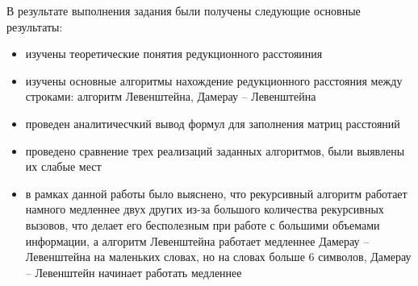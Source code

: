 \Conclusion %

В результате выполнения задания были получены следующие основные результаты:

\begin{itemize}
    \item изучены теоретические понятия редукционного расстояиния
    \item изучены основные алгоритмы нахождение редукционного расстояния между строками: алгоритм Левенштейна, Дамерау -- Левенштейна
    \item проведен аналитичесчкий вывод формул для заполнения матриц расстояний
    \item проведено сравнение трех реализаций заданных алгоритмов, были выявлены их слабые мест
    \item в рамках данной работы было выяснено, что рекурсивный алгоритм работает намного медленнее двух других из-за большого количества рекурсивных вызовов, что делает его бесполезным при работе с большими объемами информации, а алгоритм Левенштейна работает медленнее Дамерау -- Левенштейна на маленьких словах, но на словах больше 6 символов, Дамерау -- Левенштейн начинает работать медленнее
\end{itemize}
